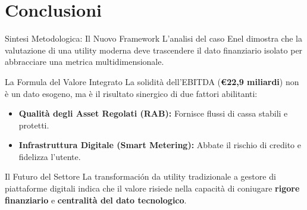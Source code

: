 
\section{Conclusioni}

\begin{frame}{Sintesi Metodologica: Il Nuovo Framework}
    L'analisi del caso Enel dimostra che la valutazione di una utility moderna deve trascendere il dato finanziario isolato per abbracciare una metrica multidimensionale.
    \vspace{0.1cm}
    

    \begin{block}{La Formula del Valore Integrato}
        La solidità dell'EBITDA (\textbf{€22,9 miliardi}) non è un dato esogeno, ma è il risultato sinergico di due fattori abilitanti:
        \begin{itemize}
            \item \textbf{Qualità degli Asset Regolati (RAB):} Fornisce flussi di cassa stabili e protetti.
            \item \textbf{Infrastruttura Digitale (Smart Metering):} Abbate il rischio di credito e fidelizza l'utente.
    \end{itemize}
    \end{block}
    \vspace{-0.1cm}
    \pause

    \begin{alertblock}{Il Futuro del Settore}
        La transformación da utility tradizionale a gestore di piattaforme digitali indica che il valore risiede nella capacità di coniugare \textbf{rigore finanziario} e \textbf{centralità del dato tecnologico}.
    \end{alertblock}
\end{frame}


